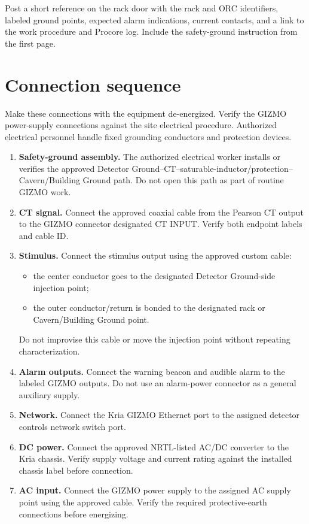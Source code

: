 \documentclass[11pt]{article}
\newcommand{\GIZMO}{\textsc{GIZMO}}
\begin{document}
Post a short reference on the rack door with the rack and ORC identifiers, labeled ground points, expected alarm indications, current contacts, and a link to the work procedure and Procore log. Include the safety-ground instruction from the first page.

\section{Connection sequence}

Make these connections with the equipment de-energized. Verify the GIZMO power-supply connections against the site electrical procedure. Authorized electrical personnel handle fixed grounding conductors and protection devices.

\begin{enumerate}
  \item \textbf{Safety-ground assembly.} The authorized electrical worker installs or verifies the approved Detector Ground--CT--saturable-inductor/protection--Cavern/Building Ground path. Do not open this path as part of routine \GIZMO{} work.

  \item \textbf{CT signal.} Connect the approved coaxial cable from the Pearson CT output to the \GIZMO{} connector designated \textsc{CT INPUT}. Verify both endpoint labels and cable ID.

  \item \textbf{Stimulus.} Connect the stimulus output using the approved custom cable:
  \begin{itemize}
    \item the center conductor goes to the designated Detector Ground-side injection point;
    \item the outer conductor/return is bonded to the designated rack or Cavern/Building Ground point.
  \end{itemize}
  Do not improvise this cable or move the injection point without repeating characterization.

  \item \textbf{Alarm outputs.} Connect the warning beacon and audible alarm to the labeled \GIZMO{} outputs. Do not use an alarm-power connector as a general auxiliary supply.

  \item \textbf{Network.} Connect the Kria \GIZMO{} Ethernet port to the assigned detector controls network switch port.

  \item \textbf{DC power.} Connect the approved NRTL-listed AC/DC converter to the Kria chassis. Verify supply voltage and current rating against the installed chassis label before connection.

  \item \textbf{AC input.} Connect the GIZMO power supply to the assigned AC supply point using the approved cable. Verify the required protective-earth connections before energizing.
\end{enumerate}
\end{document}
